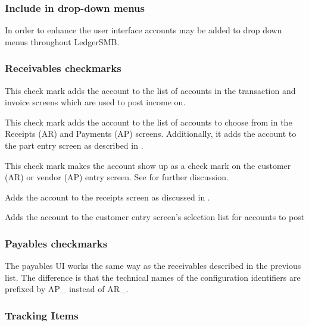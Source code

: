 \subsubsection{Include in drop-down menus}
\label{subsec-coa-account-links}

In order to enhance the user interface accounts may be added to drop down menus throughout LedgerSMB.

\subsubsection{Receivables checkmarks}
\label{subsubsec-coa-AR-checkmarks}

\begin{description}[style=nextline]
    \item[Income (AR\_amount)] This check mark adds the account to the list of accounts
    in the transaction and invoice screens which are used to post income on.
    \item[Payment (AR\_paid)] This check mark adds the account to the list of accounts
    to choose from in the Receipts (AR) and Payments (AP) screens. Additionally, it
    adds the account to the part entry screen as described in .
    \item[Tax (AR\_tax)] This check mark makes the account show up as a check mark on the
    \gls{customer} (AR) or vendor (AP) entry screen. See  for further discussion.
    \item[Overpayment (AR\_overpayment)] Adds the account to the receipts screen as discussed
    in .
    \item[Discount (AR\_discount)] Adds the account to the customer entry screen's selection
    list for accounts to post 
\end{description}

\subsubsection{Payables checkmarks}
\label{subsubsec-coa-AP-checkmarks}

The payables UI works the same way as the receivables described in the previous list. The difference is
that the technical names of the configuration identifiers are prefixed by AP\_ instead
of AR\_.

\subsubsection{Tracking Items}
\label{subsubsec-coa-tracking-items}

